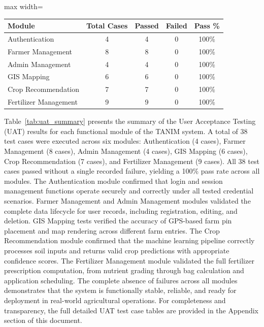 {\begin{table}[H]
		\begin{adjustbox}{max width=\textwidth}
			\begin{tabular}{lcccc}
				\toprule
				\textbf{Module} & \textbf{Total Cases} & \textbf{Passed} & \textbf{Failed} & \textbf{Pass \%} \\
				\midrule
				Authentication          & 4 & 4 & 0 & 100\% \\
				Farmer Management       & 8 & 8 & 0 & 100\% \\
				Admin Management        & 4 & 4 & 0 & 100\% \\
				GIS Mapping             & 6 & 6 & 0 & 100\% \\
				Crop Recommendation     & 7 & 7 & 0 & 100\% \\
				Fertilizer Management   & 9 & 9 & 0 & 100\% \\
				\bottomrule
			\end{tabular}
		\end{adjustbox}
		
	\end{table}
	
	Table~\ref{tab:uat_summary} presents the summary of the User Acceptance Testing (UAT) results for each functional module of the TANIM system. A total of 38 test cases were executed across six modules: Authentication (4 cases), Farmer Management (8 cases), Admin Management (4 cases), GIS Mapping (6 cases), Crop Recommendation (7 cases), and Fertilizer Management (9 cases). All 38 test cases passed without a single recorded failure, yielding a 100\% pass rate across all modules. The Authentication module confirmed that login and session management functions operate securely and correctly under all tested credential scenarios. Farmer Management and Admin Management modules validated the complete data lifecycle for user records, including registration, editing, and deletion. GIS Mapping tests verified the accuracy of GPS-based farm pin placement and map rendering across different farm entries. The Crop Recommendation module confirmed that the machine learning pipeline correctly processes soil inputs and returns valid crop predictions with appropriate confidence scores. The Fertilizer Management module validated the full fertilizer prescription computation, from nutrient grading through bag calculation and application scheduling. The complete absence of failures across all modules demonstrates that the system is functionally stable, reliable, and ready for deployment in real-world agricultural operations. For completeness and transparency, the full detailed UAT test case tables are provided in the Appendix section of this document.
	
}
